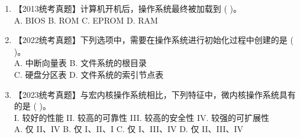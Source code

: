 \documentclass[lang=cn,newtx,10pt,scheme=chinese]{../../elegantbook}
\begin{document}
\begin{enumerate}
    \item 【2013统考真题】计算机开机后，操作系统最终被加载到 (    )。\\
    A. BIOS \quad B. ROM \quad C. EPROM \quad D. RAM

    \item 【2022统考真题】下列选项中，需要在操作系统进行初始化过程中创建的是 (    )。\\
    A. 中断向量表 \quad B. 文件系统的根目录\\
    C. 硬盘分区表 \quad D. 文件系统的索引节点表
    \item 【2023统考真题】与宏内核操作系统相比，下列特征中，微内核操作系统具有的是 (    )。\\
  I. 较好的性能 \quad II. 较高的可靠性 \quad III. 较高的安全性 \quad IV. 较强的可扩展性\\
  A. 仅 II、IV \quad B. 仅 I、II、I \quad C. 仅 I、III、IV \quad D. 仅 II、III、IV
\end{enumerate}
\end{document}
